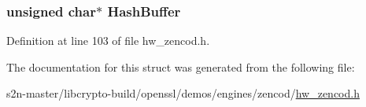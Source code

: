 \subsubsection[{\texorpdfstring{Hash\+Buffer}{HashBuffer}}]{\setlength{\rightskip}{0pt plus 5cm}unsigned char$\ast$ Hash\+Buffer}\hypertarget{struct_z_e_n__data__st_a62ede32ce062d7fb677d0f2470baa8da}{}\label{struct_z_e_n__data__st_a62ede32ce062d7fb677d0f2470baa8da}


Definition at line 103 of file hw\+\_\+zencod.\+h.



The documentation for this struct was generated from the following file\+:\begin{DoxyCompactItemize}
\item 
s2n-\/master/libcrypto-\/build/openssl/demos/engines/zencod/\hyperlink{hw__zencod_8h}{hw\+\_\+zencod.\+h}\end{DoxyCompactItemize}
